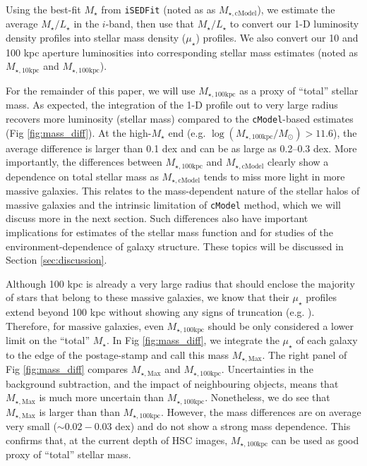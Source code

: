 \documentclass[a4paper,fleqn,usenatbib]{mnras}
\def\cmodel{\texttt{cModel}}
\def\mstar{{$M_{\star}$}}
\def\minn{{$M_{\star,10\mathrm{kpc}}$}}
\def\mtot{{$M_{\star,100\mathrm{kpc}}$}}
\def\mmax{{$M_{\star,\mathrm{Max}}$}}
\def\mcmodel{{$M_{\star,\mathrm{cModel}}$}}
\def\logmtot{{$\log (M_{\star,100\mathrm{kpc}}/M_{\odot})$}}
\def\m2l{{$M_{\star}/L_{\star}$}}
\def\mden{{$\mu_{\star}$}}
\begin{document}
    Using the best-fit \mstar{} from \texttt{iSEDFit} (noted as as \mcmodel{}), 
    we estimate the average \m2l{} in the $i$-band, then use that \m2l{} to convert 
    our 1-D luminosity density profiles into stellar mass density (\mden{}) profiles. 
    We also convert our 10 and 100 kpc aperture luminosities into corresponding stellar 
    mass estimates (noted as \minn{} and \mtot{}).

    For the remainder of this paper, we will use \mtot{} as a proxy of ``total'' 
    stellar mass. 
    As expected, the integration of the 1-D profile out to very large radius recovers 
    more luminosity (stellar mass) compared to the \cmodel{}-based estimates 
    (Fig \ref{fig:mass_diff}).
    At the high-\mstar{} end (e.g. \logmtot{}$>11.6$), the average difference is larger 
    than 0.1 dex and can be as large as 0.2--0.3 dex.  
    More importantly, the differences between \mtot{} and \mcmodel{} clearly show a 
    dependence on total stellar mass as \mcmodel{} tends to miss more light in 
    more massive galaxies.  
    This relates to the mass-dependent nature of the stellar halos of massive 
    galaxies and the intrinsic limitation of \cmodel{} method, which we will discuss
    more in the next section.
    Such differences also have important implications for estimates of the stellar 
    mass function and for studies of the environment-dependence of galaxy structure. 
    These topics will be discussed in Section \ref{sec:discussion}.
    
    Although 100 kpc is already a very large radius that should enclose the majority 
    of stars that belong to these massive galaxies, we know that their \mden{} 
    profiles extend beyond 100 kpc without showing any signs of truncation
    (e.g. \citealt{Gonzalez2005, Tal2011, DSouza2014}).
    Therefore, for massive galaxies, even \mtot{} should be only considered a lower
    limit on the ``total'' \mstar{}. 
    In Fig \ref{fig:mass_diff}, we integrate the \mden{} of each galaxy to the edge of 
    the postage-stamp and call this mass \mmax{}. 
    The right panel of Fig \ref{fig:mass_diff} compares \mmax{} and \mtot{}.  
    Uncertainties in the background subtraction, and the impact of neighbouring objects,
    means that \mmax{} is much more uncertain than \mtot{}. 
    Nonetheless, we do see that \mmax{} is larger than than \mtot{}. 
    However, the mass differences are on average very small ($\sim0.02-0.03$ dex) and 
    do not show a strong mass dependence.  
    This confirms that, at the current depth of HSC images, \mtot{} can be used as 
    good proxy of ``total'' stellar mass.   
    
\end{document}
